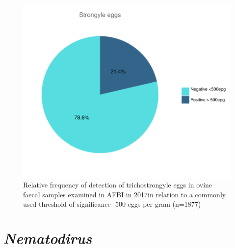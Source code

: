 \documentclass[]{book}
\begin{document}
\begin{figure}

{\centering \includegraphics{AFBI_files/figure-latex/unnamed-chunk-113-1} 

}

\caption{Relative frequency of detection of trichostrongyle eggs in ovine faecal samples examined in AFBI in 2017in relation to a commonly used threshold of significance- 500 eggs per gram (n=1877)}\label{fig:unnamed-chunk-113}
\end{figure}

\section{\texorpdfstring{\emph{Nematodirus}}{Nematodirus}}\label{nematodirus}
\end{document}
